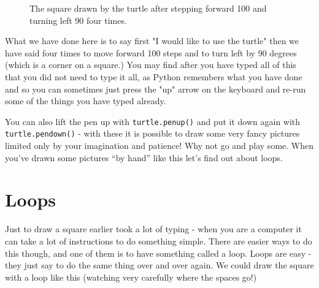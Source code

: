 \documentclass[a4paper, 11pt]{book}
\begin{document}
\begin{figure}
\label{figure-turtle-001-square}
\centering
{}
\caption{The square drawn by the turtle after stepping forward 100 and
  turning left 90 four times.}
\end{figure}

What we have done here is to say first "I would like to use the turtle" then we have said four times to move forward 100 steps and to turn left by 90 degrees (which is a corner on a square.) You may find after you have typed all of this that you did not need to type it all, as Python remembers what you have done and so you can sometimes just press the "up" arrow on the keyboard and re-run some of the things you have typed already.

You can also lift the pen up with \verb|turtle.penup()| and put it down again with \verb|turtle.pendown()| - with these it is possible to draw some very fancy pictures limited only by your imagination and patience! Why not go and play some. When you've drawn some pictures ``by hand'' like this let's find out about loops.

\section{Loops}

Just to draw a square earlier took a lot of typing - when you are a
computer it can take a lot of instructions to do something
simple. There are easier ways to do this though, and one of them is to
have something called a loop. Loops are easy - they just say to do the
same thing over and over again. We could draw the square with a loop
like this (watching very carefully where the spaces go!)
\end{document}
